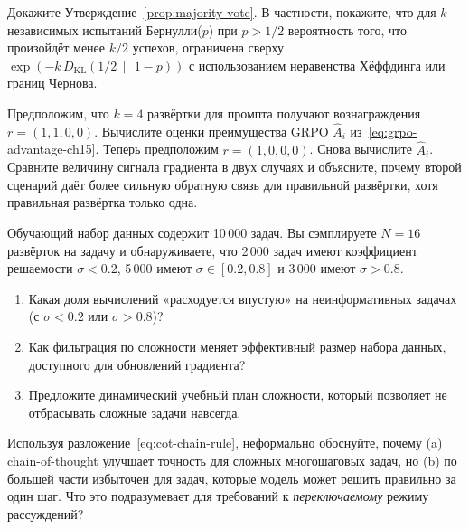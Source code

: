 \begin{exercise}
\label{ex:majority-vote-bound}
Докажите Утверждение~\ref{prop:majority-vote}. В частности, покажите, что
для $k$ независимых испытаний Бернулли($p$) при $p > 1/2$ вероятность
того, что произойдёт менее $k/2$ успехов, ограничена сверху
$\exp(-k\,D_{\mathrm{KL}}(1/2\,\|\,1-p))$ с использованием неравенства Хёффдинга
или границ Чернова.
\end{exercise}

\begin{exercise}
\label{ex:grpo-advantage-ch15}
Предположим, что $k = 4$ развёртки для промпта получают вознаграждения $r = (1, 1, 0, 0)$.
Вычислите оценки преимущества GRPO $\hat{A}_i$ из~\eqref{eq:grpo-advantage-ch15}.
Теперь предположим $r = (1, 0, 0, 0)$. Снова вычислите $\hat{A}_i$.
Сравните величину сигнала градиента в двух случаях и
объясните, почему второй сценарий даёт более сильную обратную связь для правильной
развёртки, хотя правильная развёртка только одна.
\end{exercise}

\begin{exercise}
\label{ex:difficulty-filter}
Обучающий набор данных содержит 10\,000 задач. Вы сэмплируете $N = 16$
развёрток на задачу и обнаруживаете, что 2\,000 задач имеют коэффициент решаемости
$\sigma < 0.2$, 5\,000 имеют $\sigma \in [0.2, 0.8]$ и 3\,000
имеют $\sigma > 0.8$.
\begin{enumerate}[label=(\alph*)]
\item Какая доля вычислений «расходуется впустую» на неинформативных задачах
  (с $\sigma < 0.2$ или $\sigma > 0.8$)?
\item Как фильтрация по сложности меняет эффективный размер набора данных,
  доступного для обновлений градиента?
\item Предложите динамический учебный план сложности, который позволяет не отбрасывать
  сложные задачи навсегда.
\end{enumerate}
\end{exercise}

\begin{exercise}
\label{ex:cot-information}
Используя разложение~\eqref{eq:cot-chain-rule}, неформально обоснуйте,
почему (a) chain-of-thought улучшает точность для сложных многошаговых
задач, но (b) по большей части избыточен для задач, которые модель может
решить правильно за один шаг. Что это подразумевает для
требований к \emph{переключаемому} режиму рассуждений?
\end{exercise}

